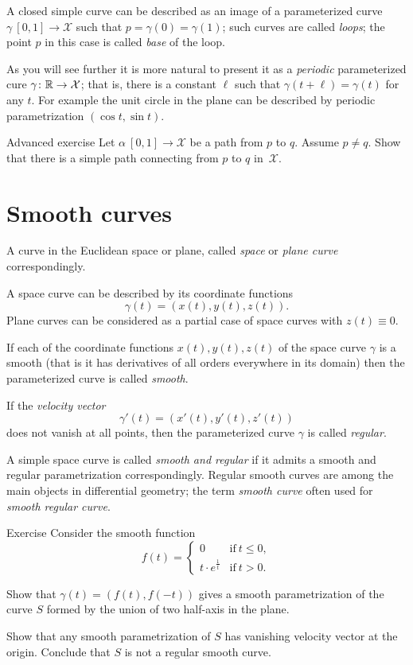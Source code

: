 A closed simple curve can be described as an image of a parameterized curve $\gamma\: [0,1]\to \mathcal{X}$ such that $p=\gamma(0)=\gamma(1)$;
such curves are called \emph{loops}; 
the point $p$ in this case is called \emph{base} of the loop.

As you will see further it is more natural to present it as a \emph{periodic} parameterized cure $\gamma\colon \mathbb{R}\to \mathcal{X}$; that is, there is a constant $\ell$ such that $\gamma(t+\ell)=\gamma(t)$ for any $t$.
For example the unit circle in the plane can be described by periodic parametrization $(\cos t,\sin t)$.

\begin{thm}{Advanced exercise}
Let $\alpha\:[0,1]\to\mathcal{X}$ be a path from $p$ to $q$.
Assume $p\ne q$.
Show that there is a simple path connecting from $p$ to $q$ in~$\mathcal{X}$.
\end{thm}

\section*{Smooth curves}

A curve in the Euclidean space or plane, called \emph{space} or \emph{plane curve} correspondingly.

A space curve can be described by its coordinate functions 
\[\gamma(t)=(x(t),y(t),z(t)).\]
Plane curves can be considered as a partial case of space curves with $z(t)\equiv 0$.

If each of the coordinate functions $x(t),y(t),z(t)$ of the space curve $\gamma$ is a smooth (that is it has derivatives of all orders everywhere in its domain) then the parameterized curve is called \emph{smooth}.

If the \emph{velocity vector} 
\[\gamma'(t)=(x'(t),y'(t),z'(t))\] 
does not vanish at all points, then the parameterized curve $\gamma$ is called \emph{regular}.

A simple space curve is called \emph{smooth and regular} if it admits a smooth and regular parametrization correspondingly.
Regular smooth curves are among the main objects in differential geometry;
the term \emph{smooth curve} often used for \emph{smooth regular curve}. 

\begin{thm}{Exercise}\label{ex:L-shape}
Consider the smooth function 
\[f(t)=
\begin{cases}
0&\text{if}\ t\le 0,
\\
t\cdot e^{\frac1t}&\text{if}\ t> 0.
\end{cases}
\]

Show that $\gamma(t)=(f(t),f(-t))$ gives a smooth parametrization of the curve $S$ formed by the union of two half-axis in the plane.

Show that any smooth parametrization of $S$ has vanishing velocity vector at the origin.
Conclude that $S$ is not a regular smooth curve.
\end{thm}


